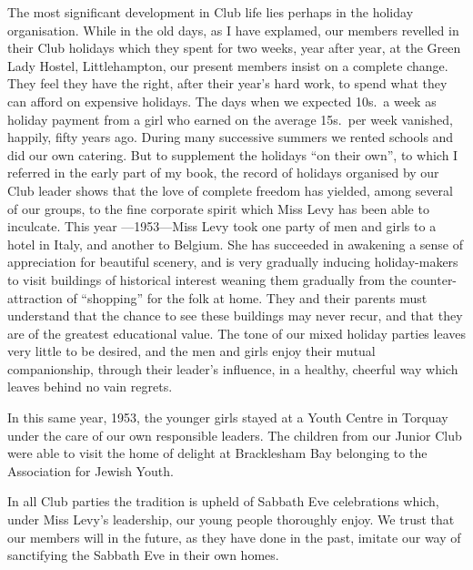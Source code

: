 The most significant development in Club life lies
perhaps in the holiday organisation. While in the old
days, as I have explamed, our members revelled in their
Club holidays which they spent for two weeks, year after
year, at the Green Lady Hostel, Littlehampton, our
present members insist on a complete change. They
feel they have the right, after their year’s hard work,
to spend what they can afford on expensive holidays.
The days when we expected 10s.\ a week as holiday
payment from a girl who earned on the average 15s.\ per
week vanished, happily, fifty years ago. During many
successive summers we rented schools and did our own
catering. But to supplement the holidays “on their
own”, to which I referred in the early part of my book,
the record of holidays organised by our Club leader
shows that the love of complete freedom has yielded,
among several of our groups, to the fine corporate spirit
which Miss Levy has been able to inculcate. This year
—1953—Miss Levy took one party of men and girls to
a hotel in Italy, and another to Belgium. She has
succeeded in awakening a sense of appreciation for
beautiful scenery, and is very gradually inducing
holiday-makers to visit buildings of historical interest
weaning them gradually from the counter-attraction of
“shopping” for the folk at home. They and their
parents must understand that the chance to see these
buildings may never recur, and that they are of the
greatest educational value. The tone of our mixed
holiday parties leaves very little to be desired, and the
men and girls enjoy their mutual companionship,
through their leader’s influence, in a healthy, cheerful
way which leaves behind no vain regrets.

In this same year, 1953, the younger girls stayed at a
Youth Centre in Torquay under the care of our own
responsible leaders. The children from our Junior
Club were able to visit the home of delight at Bracklesham
Bay belonging to the Association for Jewish Youth.

In all Club parties the tradition is upheld of Sabbath
Eve celebrations which, under Miss Levy’s leadership,
our young people thoroughly enjoy. We trust that our
members will in the future, as they have done in the past,
imitate our way of sanctifying the Sabbath Eve in their
own homes.

